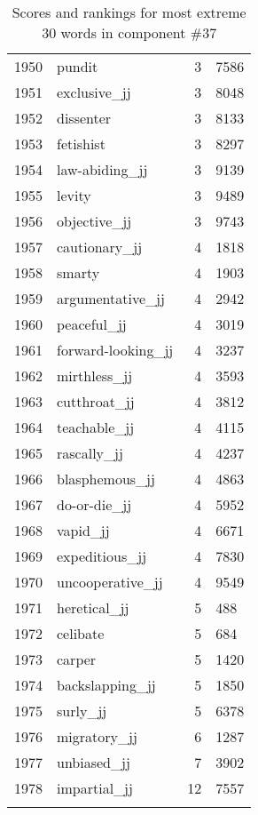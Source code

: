 \begin{longtable}[!htbp]{| rlr@{.}l |}
    1950 & pundit & 3 & 7586 \\
    1951 & exclusive\_jj & 3 & 8048 \\
    1952 & dissenter & 3 & 8133 \\
    1953 & fetishist & 3 & 8297 \\
    1954 & law-abiding\_jj & 3 & 9139 \\
    1955 & levity & 3 & 9489 \\
    1956 & objective\_jj & 3 & 9743 \\
    1957 & cautionary\_jj & 4 & 1818 \\
    1958 & smarty & 4 & 1903 \\
    1959 & argumentative\_jj & 4 & 2942 \\
    1960 & peaceful\_jj & 4 & 3019 \\
    1961 & forward-looking\_jj & 4 & 3237 \\
    1962 & mirthless\_jj & 4 & 3593 \\
    1963 & cutthroat\_jj & 4 & 3812 \\
    1964 & teachable\_jj & 4 & 4115 \\
    1965 & rascally\_jj & 4 & 4237 \\
    1966 & blasphemous\_jj & 4 & 4863 \\
    1967 & do-or-die\_jj & 4 & 5952 \\
    1968 & vapid\_jj & 4 & 6671 \\
    1969 & expeditious\_jj & 4 & 7830 \\
    1970 & uncooperative\_jj & 4 & 9549 \\
    1971 & heretical\_jj & 5 & 488 \\
    1972 & celibate & 5 & 684 \\
    1973 & carper & 5 & 1420 \\
    1974 & backslapping\_jj & 5 & 1850 \\
    1975 & surly\_jj & 5 & 6378 \\
    1976 & migratory\_jj & 6 & 1287 \\
    1977 & unbiased\_jj & 7 & 3902 \\
    1978 & impartial\_jj & 12 & 7557 \\
    \hline
    \caption{Scores and rankings for most extreme 30 words in component \#37} \\
\end{longtable}
